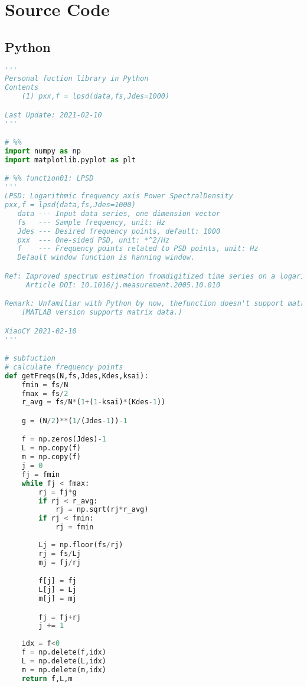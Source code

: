 \section{Source Code}

\subsection{Python}

\begin{lstlisting}[language=Python]
'''
Personal fuction library in Python
Contents
    (1) pxx,f = lpsd(data,fs,Jdes=1000)

Last Update: 2021-02-10
'''

# %%
import numpy as np
import matplotlib.pyplot as plt

# %% function01: LPSD
'''
LPSD: Logarithmic frequency axis Power SpectralDensity
pxx,f = lpsd(data,fs,Jdes=1000)
   data --- Input data series, one dimension vector
   fs   --- Sample frequency, unit: Hz
   Jdes --- Desired frequency points, default: 1000
   pxx  --- One-sided PSD, unit: *^2/Hz
   f    --- Frequency points related to PSD points, unit: Hz
   Default window function is hanning window.

Ref: Improved spectrum estimation fromdigitized time series on a logarithmicfrequency axis
     Article DOI: 10.1016/j.measurement.2005.10.010

Remark: Unfamiliar with Python by now, thefunction doesn't support matrix data by now.
    [MATLAB version supports matrix data.]

XiaoCY 2021-02-10
'''

# subfuction
# calculate frequency points
def getFreqs(N,fs,Jdes,Kdes,ksai):
    fmin = fs/N
    fmax = fs/2
    r_avg = fs/N*(1+(1-ksai)*(Kdes-1))

    g = (N/2)**(1/(Jdes-1))-1

    f = np.zeros(Jdes)-1
    L = np.copy(f)
    m = np.copy(f)
    j = 0
    fj = fmin
    while fj < fmax:
        rj = fj*g
        if rj < r_avg:
            rj = np.sqrt(rj*r_avg)
        if rj < fmin:
            rj = fmin
        
        Lj = np.floor(fs/rj)
        rj = fs/Lj
        mj = fj/rj

        f[j] = fj
        L[j] = Lj
        m[j] = mj

        fj = fj+rj
        j += 1
    
    idx = f<0
    f = np.delete(f,idx)
    L = np.delete(L,idx)
    m = np.delete(m,idx)
    return f,L,m


\end{lstlisting}
